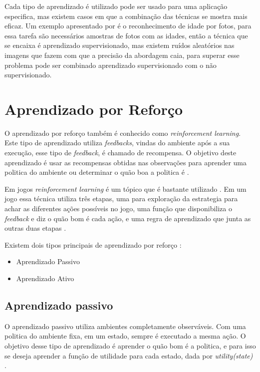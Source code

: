 Cada tipo de aprendizado é utilizado pode ser usado para uma aplicação especifica, mas existem casos em que a combinação das técnicas se mostra mais eficaz. Um exemplo apresentado por \cite{intelligence2003modern} é o reconhecimento de idade por fotos, para essa tarefa são necessários amostras de fotos com as idades, então a técnica que se encaixa é aprendizado supervisionado, mas existem ruídos aleatórios nas imagens que fazem com que a precisão da abordagem caia, para superar esse problema pode ser combinado aprendizado supervisionado com o não supervisionado.

\section{Aprendizado por Reforço}

O aprendizado por reforço também é conhecido como \textit{reinforcement learning}. Este tipo de aprendizado utiliza \textit{feedbacks}, vindas do ambiente após a sua execução, esse tipo de \textit{feedback}, é chamado de recompensa. O objetivo deste aprendizado é usar as recompensas obtidas nas observações para aprender uma politica do ambiente ou determinar o quão boa a politica é \cite{intelligence2003modern}. 

Em jogos \textit{reinforcement learning} é um tópico que é bastante utilizado \cite{millington2009artificial}. Em um jogo essa técnica utiliza três etapas, uma para exploração da estrategia para achar as diferentes ações possíveis no jogo, uma função que disponibiliza o \textit{feedback} e diz o quão bom é cada ação, e uma regra de aprendizado que junta as outras duas etapas \cite{millington2009artificial}.

Existem dois tipos principais de aprendizado por reforço \cite{intelligence2003modern}:

\begin{itemize}
	\item Aprendizado Passivo
	\item Aprendizado Ativo
\end{itemize}

\subsection{Aprendizado passivo} 

O aprendizado passivo utiliza ambientes completamente observáveis. Com uma politica do ambiente fixa, em um estado, sempre é executado a mesma ação. O objetivo desse tipo de aprendizado é aprender o quão bom é a politica, e para isso se deseja aprender a função de utilidade para cada estado, dada por \textit{utility(state)} \cite{intelligence2003modern}.

